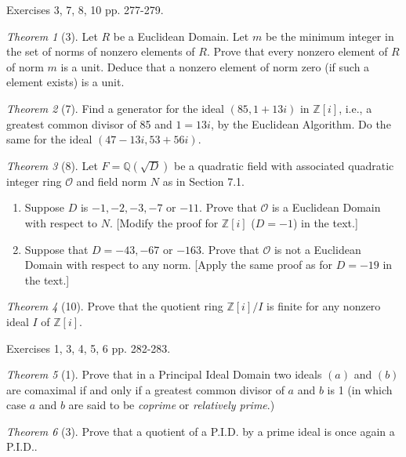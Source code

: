 \documentclass[12pt]{article}
\theoremstyle{remark}
\theoremstyle{named}
\newtheorem*{theorem}{Theorem}
\newcommand{\Z}{\mathbb Z}
\newcommand{\Q}{\mathbb Q}
\begin{document}
Exercises 3, 7, 8, 10 pp. 277-279.

\begin{theorem}[3]
    Let \(R\) be a Euclidean Domain. Let \(m\) be the minimum integer in the set of norms of nonzero elements of \(R\). Prove that every nonzero element of \(R\) of norm \(m\) is a unit. Deduce that a nonzero element of norm zero (if such a element exists) is a unit.
\end{theorem}

\begin{theorem}[7]
    Find a generator for the ideal \((85, 1 + 13i)\) in \(\Z[i]\), i.e., a greatest common divisor of 85 and \(1 = 13i\), by the Euclidean Algorithm. Do the same for the ideal \((47 - 13i, 53 + 56i)\).
\end{theorem}

\begin{theorem}[8]
    Let \(F = \Q(\sqrt{D})\) be a quadratic field with associated quadratic integer ring \(\mathcal O\) and field norm \(N\) as in Section 7.1.
    \begin{enumerate}
        \item Suppose \(D\) is \(-1, -2, -3, -7\) or \(-11\). Prove that \(\mathcal O\) is a Euclidean Domain with respect to \(N\). [Modify the proof for \(\Z[i]\) (\(D = -1\)) in the text.]
        \item Suppose that \(D = -43, -67\) or \(-163\). Prove that \(\mathcal O\) is not a Euclidean Domain with respect to any norm. [Apply the same proof as for \(D = -19\) in the text.]
    \end{enumerate}
\end{theorem}

\begin{theorem}[10]
    Prove that the quotient ring \(\Z[i]/I\) is finite for any nonzero ideal \(I\) of \(\Z[i]\).
\end{theorem}

Exercises 1, 3, 4, 5, 6 pp. 282-283.

\begin{theorem}[1]
    Prove that in a Principal Ideal Domain two ideals \((a)\) and \((b)\) are comaximal if and only if a greatest common divisor of \(a\) and \(b\) is 1 (in which case \(a\) and \(b\) are said to be \textit{coprime} or \textit{relatively prime}.)
\end{theorem}

\begin{theorem}[3]
    Prove that a quotient of a P.I.D. by a prime ideal is once again a P.I.D..
\end{theorem}
\end{document}
